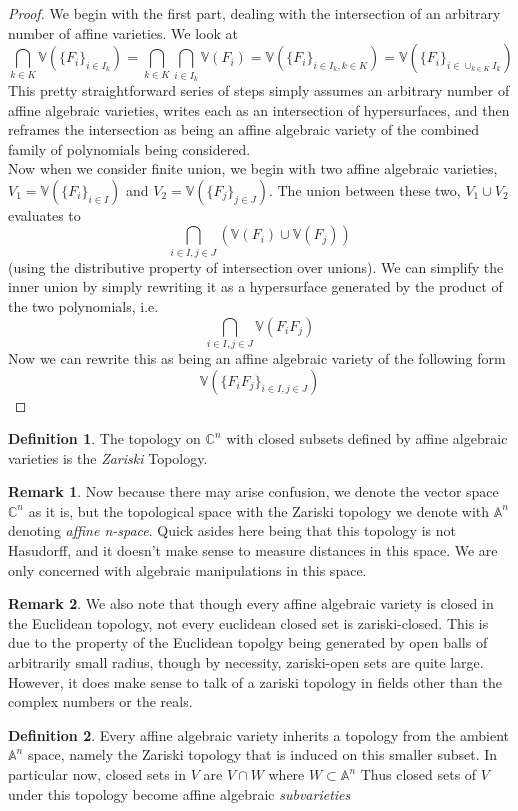 \documentclass[12pt]{book}
\theoremstyle{definition}
\newtheorem*{defn}{Definition}
\newtheorem*{rem}{Remark}
\begin{document}
\begin{proof}
    We begin with the first part, dealing with the intersection of an arbitrary number of affine varieties. We look at $$\bigcap_{k \in K} \mathbb{V}(\{F_i\}_{i \in I_k}) = \bigcap_{k \in K} \bigcap_{i \in I_k} \mathbb{V}(F_i) = \mathbb{V}(\{F_i\}_{i \in I_k, k \in K}) = \mathbb{V}(\{F_i\}_{i \in \cup_{k \in K} I_k}) $$
    This pretty straightforward series of steps simply assumes an arbitrary number of affine algebraic varieties, writes each as an intersection of hypersurfaces, and then reframes the intersection as being an affine algebraic variety of the combined family of polynomials being considered.\\
    Now when we consider finite union, we begin with two affine algebraic varieties, $V_1 = \mathbb{V}(\{F_i\}_{i \in I})$ and $V_2 = \mathbb{V}(\{F_j\}_{j \in J})$. The union between these two, $V_1 \cup V_2$ evaluates to $$\bigcap_{i \in I, j \in J} (\mathbb{V}(F_i) \cup \mathbb{V}(F_j))$$ (using the distributive property of intersection over unions). We can simplify the inner union by simply rewriting it as a hypersurface generated by the product of the two polynomials, i.e. $$ \bigcap_{i \in I, j \in J} \mathbb{V}(F_iF_j)$$
    Now we can rewrite this as being an affine algebraic variety of the following form $$ \mathbb{V}(\{F_iF_j\}_{i \in I, j \in J})$$ 
\end{proof}

\begin{defn}
    The topology on $\mathbb{C}^n$ with closed subsets defined by affine algebraic varieties is the \textit{Zariski} Topology.
\end{defn}
\begin{rem}
    Now because there may arise confusion, we denote the vector space $\mathbb{C}^n$ as it is, but the topological space with the Zariski topology we denote with $\mathbb{A}^n$ denoting \textit{affine n-space}. Quick asides here being that this topology is not Hasudorff, and it doesn't make sense to measure distances in this space. We are only concerned with algebraic manipulations in this space.
\end{rem}
\begin{rem}
    We also note that though every affine algebraic variety is closed in the Euclidean topology, not every euclidean closed set is zariski-closed. This is due to the property of the Euclidean topolgy being generated by open balls of arbitrarily small radius, though by necessity, zariski-open sets are quite large. However, it does make sense to talk of a zariski topology in fields other than the complex numbers or the reals. 
\end{rem}
\begin{defn}
    Every affine algebraic variety inherits a topology from the ambient $\mathbb{A}^n$ space, namely the Zariski topology that is induced on this smaller subset. In particular now, closed sets in $V$ are $V \cap W$ where $W \subset \mathbb{A}^n$ Thus closed sets of $V$ under this topology become affine algebraic \textit{subvarieties}
\end{defn}
\end{document}
